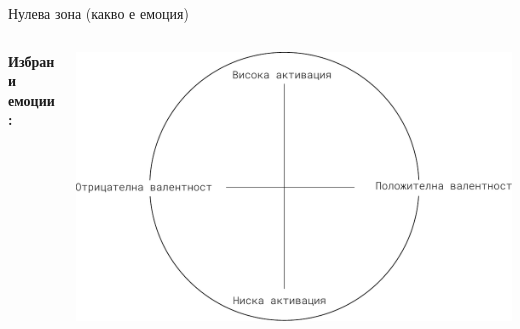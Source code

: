 \documentclass[9pt]{beamer}
\begin{document}
    \begin{frame}{Нулева зона (какво е емоция)}
        \begin{columns}[T] %
            \begin{column}{.38\textwidth}
                \textbf{Избрани емоции:}
                \vspace{1cm}\\
                \phantom{$\bullet\ $ Гняв}
                \vspace{1cm}\\
                \phantom{$\bullet\ $ Щастие}
                \vspace{1cm}\\
                \phantom{$\bullet\ $ Неутрална емоция}
                \vspace{1cm}\\
                \phantom{$\bullet\ $ Тъга}
            \end{column}%
            \hfill%
            \begin{column}{.60\textwidth}
                \vspace{1cm}
                \begin{center}
                    \includegraphics[width=\textwidth]{valence_arousal_empty}%
                \end{center}
            \end{column}%
        \end{columns}
    \end{frame}
\end{document}
